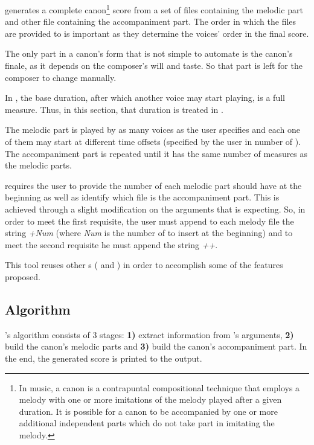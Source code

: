 \canonabc{} generates a complete canon\footnote{In music, a canon is a contrapuntal compositional
technique that employs a melody with one or more imitations of the melody played after a given
duration. It is possible for a canon to be accompanied by one or more additional independent parts
which do not take part in imitating the melody.} score from a set of \abc{} files containing the
melodic part and other file containing the accompaniment part. The order in which the \abc{} files
are provided to \canonabc{} is important as they determine the voices' order in the final score.

The only part in a canon's form that is not simple to automate is the canon's finale, as it depends
on the composer's will and taste. So that part is left for the composer to change manually.

In \canonabc, the base duration, after which another voice may start playing, is a full measure.
Thus, in this section, that duration is treated in \measurerests{}.

The melodic part is played by as many voices as the user specifies and each one of them may start at
different time offsets (specified by the user in number of \measurerests{}). The accompaniment part
is repeated until it has the same number of measures as the melodic parts.

\canonabc{} requires the user to provide the number of \measurerests{} each melodic part should have
at the beginning as well as identify which \abc{} file is the accompaniment part. This is achieved
through a slight modification on the arguments that \canonabc{} is expecting. So, in order to meet
the first requisite, the user must append to each melody file the string \emph{+Num} (where
\emph{Num} is the number of \measurerests{} to insert at the beginning) and to meet the second
requisite he must append the string \emph{++}.

This tool reuses other \abcpt{}s (\catabc{} and \pasteabc{}) in order to accomplish some of the
features proposed.

\subsection*{Algorithm}

\canonabc{}'s algorithm consists of 3 stages: \textbf{1)} extract information from \canonabc{}'s
arguments, \textbf{2)} build the canon's melodic parts and \textbf{3)} build the canon's
accompaniment part. In the end, the generated score is printed to the output.

